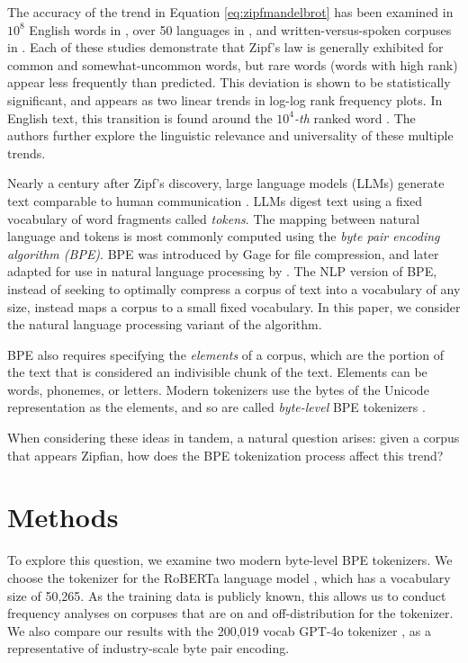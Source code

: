 \documentclass[11pt]{article}
\begin{document}
The accuracy of the trend in Equation \ref{eq:zipfmandelbrot} has been examined in $10^8$ English words in \cite{cancho2000}, over 50 languages in \cite{yu2018zipfslaw50languages}, and written-versus-spoken corpuses in \cite{lin2015scalinglawshumanspeech}. Each of these studies demonstrate that Zipf's law is generally exhibited for common and somewhat-uncommon words, but rare words (words with high rank) appear less frequently than predicted. This deviation is shown to be statistically significant, and appears as two linear trends in log-log rank frequency plots. In English text, this transition is found around the $10^4$\textit{-th} ranked word \cite{cancho2000} \cite{yu2018zipfslaw50languages}. The authors further explore the linguistic relevance and universality of these multiple trends. 

Nearly a century after Zipf's discovery, large language models (LLMs) generate text comparable to human communication \cite{llmturingtest}. LLMs digest text using a fixed vocabulary of word fragments called \textit{tokens}. The mapping between natural language and tokens is most commonly computed using the \textit{byte pair encoding algorithm (BPE)}. BPE was introduced by Gage \cite{bpegage} for file compression, and later adapted for use in natural language processing by \cite{sennrich2016neuralmachinetranslationrare}. The NLP version of BPE, instead of seeking to optimally compress a corpus of text into a vocabulary of any size, instead maps a corpus to a small fixed vocabulary. In this paper, we consider the natural language processing variant of the algorithm. 

BPE also requires specifying the \textit{elements} of a corpus, which are the portion of the text that is considered an indivisible chunk of the text. Elements can be words, phonemes, or letters. Modern tokenizers use the bytes of the Unicode representation as the elements, and so are called \textit{byte-level} BPE tokenizers \cite{radford2019language}. 

When considering these ideas in tandem, a natural question arises: given a corpus that appears Zipfian, how does the BPE tokenization process affect this trend?

\section{Methods}

To explore this question, we examine two modern byte-level BPE tokenizers. We choose the tokenizer for the RoBERTa language model \cite{liu2019robertarobustlyoptimizedbert}, which has a vocabulary size of 50,265. As the training data is publicly known, this allows us to conduct frequency analyses on corpuses that are on and off-distribution for the tokenizer.  We also compare our results with the 200,019 vocab GPT-4o tokenizer \cite{openai2024gpt4technicalreport}, as a representative of industry-scale byte pair encoding. 
\end{document}
